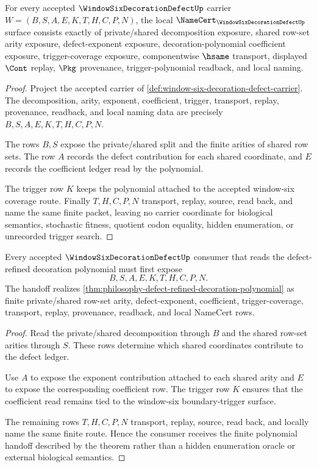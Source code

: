\begin{theorem}\label{thm:window-six-decoration-defect-namecert-obligations}
For every accepted $\WindowSixDecorationDefectUp$ carrier $W=(B,S,A,E,K,T,H,C,P,N)$, the local $\NameCert_{\WindowSixDecorationDefectUp}$ surface consists exactly of private/shared decomposition exposure, shared row-set arity exposure, defect-exponent exposure, decoration-polynomial coefficient exposure, trigger-coverage exposure, componentwise $\hsame$ transport, displayed $\Cont$ replay, $\Pkg$ provenance, trigger-polynomial readback, and local naming.
\end{theorem}
\begin{proof}
Project the accepted carrier of \autoref{def:window-six-decoration-defect-carrier}. The decomposition, arity, exponent, coefficient, trigger, transport, replay, provenance, readback, and local naming data are precisely $B,S,A,E,K,T,H,C,P,N$.

The rows $B,S$ expose the private/shared split and the finite arities of shared row sets. The row $A$ records the defect contribution for each shared coordinate, and $E$ records the coefficient ledger read by the polynomial.

The trigger row $K$ keeps the polynomial attached to the accepted window-six coverage route. Finally $T,H,C,P,N$ transport, replay, source, read back, and name the same finite packet, leaving no carrier coordinate for biological semantics, stochastic fitness, quotient codon equality, hidden enumeration, or unrecorded trigger search.
\end{proof}

\begin{theorem}\label{thm:window-six-decoration-defect-polynomial-handoff}
Every accepted $\WindowSixDecorationDefectUp$ consumer that reads the defect-refined decoration polynomial must first expose
$$
B,S,A,E,K,T,H,C,P,N .
$$
The handoff realizes \autoref{thm:philosophy-defect-refined-decoration-polynomial} as finite private/shared row-set arity, defect-exponent, coefficient, trigger-coverage, transport, replay, provenance, readback, and local NameCert rows.
\end{theorem}
\begin{proof}
Read the private/shared decomposition through $B$ and the shared row-set arities through $S$. These rows determine which shared coordinates contribute to the defect ledger.

Use $A$ to expose the exponent contribution attached to each shared arity and $E$ to expose the corresponding coefficient row. The trigger row $K$ ensures that the coefficient read remains tied to the window-six boundary-trigger surface.

The remaining rows $T,H,C,P,N$ transport, replay, source, read back, and locally name the same finite route. Hence the consumer receives the finite polynomial handoff described by the theorem rather than a hidden enumeration oracle or external biological semantics.
\end{proof}

